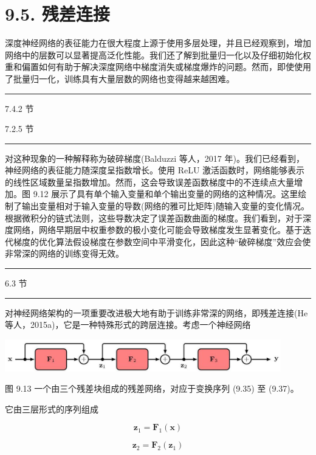 \documentclass[10pt]{report}
\newcommand{\HRule}{\begin{center}\rule{0.9\linewidth}{0.2mm}\end{center}}
\begin{document}
\section*{9.5. 残差连接}

深度神经网络的表征能力在很大程度上源于使用多层处理，并且已经观察到，增加网络中的层数可以显著提高泛化性能。我们还了解到批量归一化以及仔细初始化权重和偏置如何有助于解决深度网络中梯度消失或梯度爆炸的问题。然而，即使使用了批量归一化，训练具有大量层数的网络也变得越来越困难。

\HRule

7.4.2 节

7.2.5 节

\HRule

对这种现象的一种解释称为破碎梯度(Balduzzi 等人，2017 年)。我们已经看到，神经网络的表征能力随深度呈指数增长。使用 ReLU 激活函数时，网络能够表示的线性区域数量呈指数增加。然而，这会导致误差函数梯度中的不连续点大量增加。图 9.12 展示了具有单个输入变量和单个输出变量的网络的这种情况。这里绘制了输出变量相对于输入变量的导数(网络的雅可比矩阵)随输入变量的变化情况。根据微积分的链式法则，这些导数决定了误差函数曲面的梯度。我们看到，对于深度网络，网络早期层中权重参数的极小变化可能会导致梯度发生显著变化。基于迭代梯度的优化算法假设梯度在参数空间中平滑变化，因此这种“破碎梯度”效应会使非常深的网络的训练变得无效。

\HRule

6.3 节

\HRule

对神经网络架构的一项重要改进极大地有助于训练非常深的网络，即残差连接(He 等人，2015a)，它是一种特殊形式的跨层连接。考虑一个神经网络

\begin{center}
\includegraphics[max width=0.9\textwidth]{images/0194e279-9b28-703a-88f4-c3ac21e2010d_294_340_342_1114_130_0.jpg}
\end{center}
\hspace*{3em} 

图 9.13 一个由三个残差块组成的残差网络，对应于变换序列 (9.35) 至 (9.37)。

它由三层形式的序列组成

\[
{\mathbf{z}}_{1} = {\mathbf{F}}_{1}\left( \mathbf{x}\right)  \tag{9.32}
\]

\[
{\mathbf{z}}_{2} = {\mathbf{F}}_{2}\left( {\mathbf{z}}_{1}\right)  \tag{9.33}
\]
\end{document}
